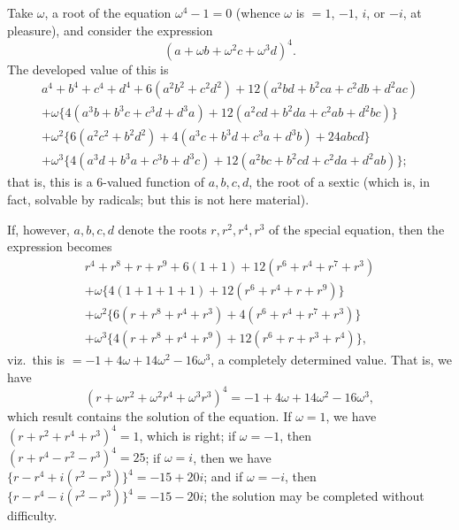 \documentclass[11pt,a4paper]{article}
\begin{document}
Take $\omega$, a root of the equation $\omega^{4} - 1 = 0$ (whence $\omega$ is $= 1$, $-1$, $i$, or $-i$, at pleasure), and consider the expression
\[
(a + \omega b + \omega^{2}c + \omega^{3}d)^{4}.
\]
The developed value of this is
\begin{multline*}
a^{4} + b^{4} + c^{4} + d^{4} + 6(a^{2}b^{2} + c^{2}d^{2}) + 12(a^{2}bd + b^{2}ca + c^{2}db + d^{2}ac) \\
+ \omega\{4(a^{3}b + b^{3}c + c^{3}d + d^{3}a) + 12(a^{2}cd + b^{2}da + c^{2}ab + d^{2}bc)\} \\
+ \omega^{2}\{6(a^{2}c^{2} + b^{2}d^{2}) + 4(a^{3}c + b^{3}d + c^{3}a + d^{3}b) + 24abcd\} \\
+ \omega^{3}\{4(a^{3}d + b^{3}a + c^{3}b + d^{3}c) + 12(a^{2}bc + b^{2}cd + c^{2}da + d^{2}ab)\};
\end{multline*}
that is, this is a 6-valued function of $a, b, c, d$, the root of a sextic (which is, in fact, solvable by radicals; but this is not here material).

If, however, $a, b, c, d$ denote the roots $r, r^{2}, r^{4}, r^{3}$ of the special equation, then the expression becomes
\begin{multline*}
r^{4} + r^{8} + r + r^{9} + 6(1 + 1) + 12(r^{6} + r^{4} + r^{7} + r^{3}) \\
+ \omega\{4(1 + 1 + 1 + 1) + 12(r^{6} + r^{4} + r + r^{9})\} \\
+ \omega^{2}\{6(r + r^{8} + r^{4} + r^{3}) + 4(r^{6} + r^{4} + r^{7} + r^{3})\} \\
+ \omega^{3}\{4(r + r^{8} + r^{4} + r^{9}) + 12(r^{6} + r + r^{3} + r^{4})\},
\end{multline*}
viz.\ this is $= -1 + 4\omega + 14\omega^{2} - 16\omega^{3}$, a completely determined value. That is, we have
\[
(r + \omega r^{2} + \omega^{2}r^{4} + \omega^{3}r^{3})^{4} = -1 + 4\omega + 14\omega^{2} - 16\omega^{3},
\]
which result contains the solution of the equation. If $\omega = 1$, we have $(r + r^{2} + r^{4} + r^{3})^{4} = 1$, which is right; if $\omega = -1$, then $(r + r^{4} - r^{2} - r^{3})^{4} = 25$; if $\omega = i$, then we have $\{r - r^{4} + i(r^{2} - r^{3})\}^{4} = -15 + 20i$; and if $\omega = -i$, then $\{r - r^{4} - i(r^{2} - r^{3})\}^{4} = -15 - 20i$; the solution may be completed without difficulty.
\end{document}
